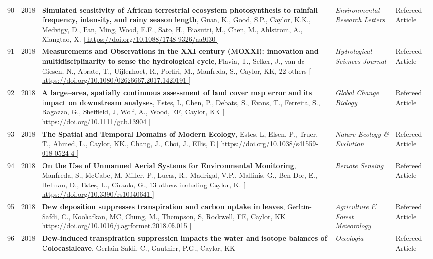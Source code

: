 \begin{supertabular}{lcp{8.25cm}p{4.75cm}p{1.75cm}}
90 & 2018 & {\bf Simulated sensitivity of African terrestrial ecosystem photosynthesis to rainfall frequency, intensity, and rainy season length}, Guan, K., Good, S.P., Caylor, K.K., Medvigy, D., Pan, Ming, Wood, E.F., Sato, H., Biasutti, M., Chen, M., Ahlstrom, A., Xiangtao, X. [\url{ https://doi.org/10.1088/1748-9326/aa9f30 }] & \emph{ Environmental Research Letters } & Refereed Article\\
91 & 2018 & {\bf Measurements and Observations in the XXI century (MOXXI): innovation and multidisciplinarity to sense the hydrological cycle}, Flavia, T., Selker, J., van de Giesen, N., Abrate, T., Uijlenhoet, R., Porfiri, M., Manfreda, S., Caylor, KK, 22 others [\url{ https://doi.org/10.1080/02626667.2017.1420191 }] & \emph{ Hydrological Sciences Journal } & Refereed Article\\
92 & 2018 & {\bf A large--area, spatially continuous assessment of land cover map error and its impact on downstream analyses}, Estes, L, Chen, P., Debats, S., Evans, T., Ferreira, S., Ragazzo, G., Sheffield, J, Wolf, A., Wood, EF, Caylor, KK [\url{ https://doi.org/10.1111/gcb.13904 }] & \emph{ Global Change Biology } & Refereed Article\\
93 & 2018 & {\bf The Spatial and Temporal Domains of Modern Ecology}, Estes, L, Elsen, P., Truer, T., Ahmed, L., Caylor, KK., Chang, J., Choi, J., Ellis, E [\url{ https://doi.org/10.1038/s41559-018-0524-4 }] & \emph{ Nature Ecology \& Evolution } & Refereed Article\\
94 & 2018 & {\bf On the Use of Unmanned Aerial Systems for Environmental Monitoring}, Manfreda, S., McCabe, M, Miller, P., Lucas, R., Madrigal, V.P., Mallinis, G., Ben Dor, E., Helman, D., Estes, L., Ciraolo, G., 13 others including Caylor, K. [\url{ https://doi.org/10.3390/rs10040641 }] & \emph{ Remote Sensing } & Refereed Article\\
95 & 2018 & {\bf Dew deposition suppresses transpiration and carbon uptake in leaves}, Gerlain-Safdi, C., Koohafkan, MC, Chung, M., Thompson, S, Rockwell, FE, Caylor, KK [\url{ https://doi.org/10.1016/j.agrformet.2018.05.015 }] & \emph{ Agriculture \& Forest Meteorology } & Refereed Article\\
96 & 2018 & {\bf Dew-induced transpiration suppression impacts the water and isotope balances of Colocasialeave}, Gerlain-Safdi, C., Gauthier, P.G., Caylor, KK  & \emph{ Oecologia } & Refereed Article\\
\end{supertabular}

